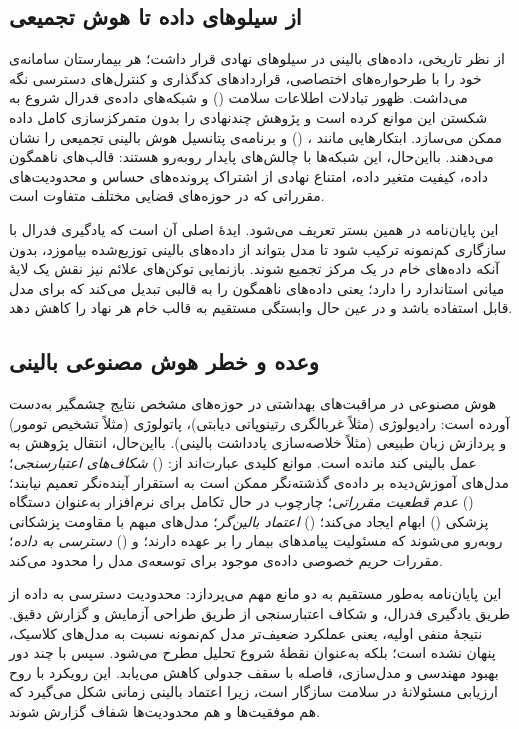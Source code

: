 \subsection{از سیلوهای داده تا هوش تجمیعی}

از نظر تاریخی، داده‌های بالینی در سیلوهای نهادی قرار داشت؛ هر بیمارستان سامانه‌ی  خود را با طرحواره‌های اختصاصی، قراردادهای کدگذاری و کنترل‌های دسترسی نگه می‌داشت. ظهور تبادلات اطلاعات سلامت () و شبکه‌های داده‌ی فدرال شروع به شکستن این موانع کرده است و پژوهش چندنهادی را بدون متمرکزسازی کامل داده ممکن می‌سازد. ابتکارهایی مانند ،  () و برنامه‌ی  پتانسیل هوش بالینی تجمیعی را نشان می‌دهند. بااین‌حال، این شبکه‌ها با چالش‌های پایدار روبه‌رو هستند: قالب‌های ناهمگون داده، کیفیت متغیر داده، امتناع نهادی از اشتراک پرونده‌های حساس و محدودیت‌های مقرراتی که در حوزه‌های قضایی مختلف متفاوت است.

این پایان‌نامه در همین بستر تعریف می‌شود. ایدۀ اصلی آن است که یادگیری فدرال با سازگاری کم‌نمونه ترکیب شود تا مدل بتواند از داده‌های بالینی توزیع‌شده بیاموزد، بدون آنکه داده‌های خام در یک مرکز تجمیع شوند. بازنمایی توکن‌های علائم نیز نقش یک لایۀ میانی استاندارد را دارد؛ یعنی داده‌های ناهمگون را به قالبی تبدیل می‌کند که برای مدل قابل استفاده باشد و در عین حال وابستگی مستقیم به قالب خام هر نهاد را کاهش دهد.

\subsection{وعده و خطر هوش مصنوعی بالینی}

هوش مصنوعی در مراقبت‌های بهداشتی در حوزه‌های مشخص نتایج چشمگیر به‌دست آورده است: رادیولوژی (مثلاً غربالگری رتینوپاتی دیابتی)، پاتولوژی (مثلاً تشخیص تومور) و پردازش زبان طبیعی (مثلاً خلاصه‌سازی یادداشت بالینی). بااین‌حال، انتقال پژوهش  به عمل بالینی کند مانده است. موانع کلیدی عبارت‌اند از: () \emph{شکاف‌های اعتبارسنجی}؛ مدل‌های آموزش‌دیده بر داده‌ی گذشته‌نگر ممکن است به استقرار آینده‌نگر تعمیم نیابند؛ () \emph{عدم قطعیت مقرراتی}؛ چارچوب در حال تکامل  برای نرم‌افزار به‌عنوان دستگاه پزشکی () ابهام ایجاد می‌کند؛ () \emph{اعتماد بالین‌گر}؛ مدل‌های مبهم با مقاومت پزشکانی روبه‌رو می‌شوند که مسئولیت پیامدهای بیمار را بر عهده دارند؛ و () \emph{دسترسی به داده}؛ مقررات حریم خصوصی داده‌ی موجود برای توسعه‌ی مدل را محدود می‌کند.

این پایان‌نامه به‌طور مستقیم به دو مانع مهم می‌پردازد: محدودیت دسترسی به داده از طریق یادگیری فدرال، و شکاف اعتبارسنجی از طریق طراحی آزمایش و گزارش دقیق. نتیجۀ منفی اولیه، یعنی عملکرد ضعیف‌تر مدل کم‌نمونه نسبت به مدل‌های کلاسیک، پنهان نشده است؛ بلکه به‌عنوان نقطۀ شروع تحلیل مطرح می‌شود. سپس با چند دور بهبود مهندسی و مدل‌سازی، فاصله با سقف جدولی کاهش می‌یابد. این رویکرد با روح ارزیابی مسئولانۀ  در سلامت سازگار است، زیرا اعتماد بالینی زمانی شکل می‌گیرد که هم موفقیت‌ها و هم محدودیت‌ها شفاف گزارش شوند.

